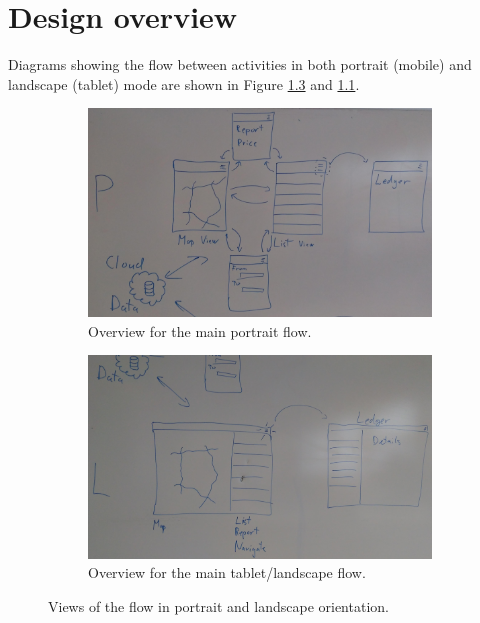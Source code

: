 
\chapter{Design overview}
Diagrams showing the flow between activities in both portrait (mobile) and landscape (tablet) mode are shown in Figure \ref{fig:l} and \ref{fig:p}.

\begin{figure}[h]
	\centering
	\begin{subfigure}[b]{0.45\textwidth}
		\centering
		\includegraphics[width=\textwidth]{P.jpg}
		\caption{Overview for the main portrait flow.}
		\label{fig:p}
	\end{subfigure}
	\quad
	\begin{subfigure}[b]{0.45\textwidth}
		\centering
		\includegraphics[width=\textwidth]{L.jpg}
		\caption{Overview for the main tablet/landscape flow.}
		\label{fig:l}
	\end{subfigure}
	\caption{Views of the flow in portrait and landscape orientation.}
\end{figure}

